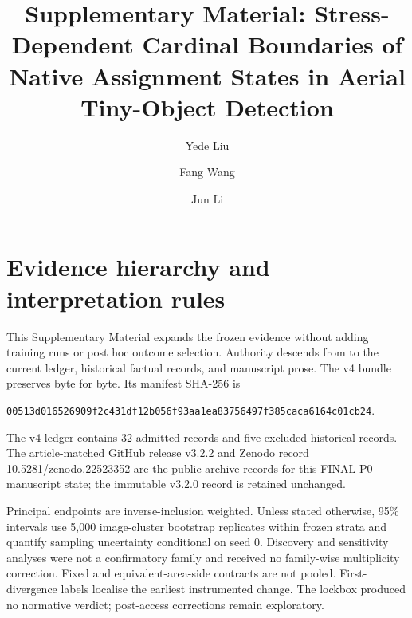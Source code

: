 \documentclass[preprint,10pt]{elsarticle}
\begin{document}
\begin{frontmatter}
\title{Supplementary Material: Stress-Dependent Cardinal Boundaries of Native Assignment States in Aerial Tiny-Object Detection}
\author[1]{Yede Liu}
\author[1]{Fang Wang}
\author[1]{Jun Li}
\address[1]{College of Physics and Electronic Engineering, Chenglong Campus, Sichuan Normal University, No. 1819, Section 2, Chenglong Avenue, Longquanyi District, Chengdu, Sichuan 610101, China}
\end{frontmatter}

\renewcommand{\thetable}{S\arabic{table}}
\renewcommand{\thefigure}{S\arabic{figure}}
\renewcommand{\theequation}{S\arabic{equation}}

\section{Evidence hierarchy and interpretation rules}

This Supplementary Material expands the frozen evidence without adding training runs or post hoc outcome selection. Authority descends from  to the current ledger, historical factual records, and manuscript prose. The v4 bundle preserves  byte for byte. Its manifest SHA-256 is
\begin{center}
\scriptsize\texttt{00513d016526909f2c431df12b056f93aa1ea83756497f385caca6164c01cb24}.
\end{center}
The v4 ledger contains 32 admitted records and five excluded historical records. The article-matched GitHub release v3.2.2 and Zenodo record 10.5281/zenodo.22523352 are the public archive records for this FINAL-P0 manuscript state; the immutable v3.2.0 record is retained unchanged.

Principal endpoints are inverse-inclusion weighted. Unless stated otherwise, 95\% intervals use 5,000 image-cluster bootstrap replicates within frozen strata and quantify sampling uncertainty conditional on seed 0. Discovery and sensitivity analyses were not a confirmatory family and received no family-wise multiplicity correction. Fixed and equivalent-area-side contracts are not pooled. First-divergence labels localise the earliest instrumented change. The lockbox produced no normative verdict; post-access corrections remain exploratory.
\end{document}
